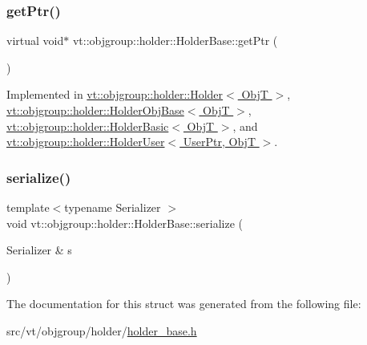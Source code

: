 \subsubsection{\texorpdfstring{get\+Ptr()}{getPtr()}}
{\footnotesize\ttfamily virtual void$\ast$ vt\+::objgroup\+::holder\+::\+Holder\+Base\+::get\+Ptr (\begin{DoxyParamCaption}{ }\end{DoxyParamCaption})\hspace{0.3cm}{\ttfamily [pure virtual]}}



Implemented in \hyperlink{structvt_1_1objgroup_1_1holder_1_1_holder_a856859dca0c0ee3fb6ebace444a36200}{vt\+::objgroup\+::holder\+::\+Holder$<$ Obj\+T $>$}, \hyperlink{structvt_1_1objgroup_1_1holder_1_1_holder_obj_base_aa08fdb3d076043c004e3674a136f84c3}{vt\+::objgroup\+::holder\+::\+Holder\+Obj\+Base$<$ Obj\+T $>$}, \hyperlink{structvt_1_1objgroup_1_1holder_1_1_holder_basic_a2a8962345709045e6d2c465b17362885}{vt\+::objgroup\+::holder\+::\+Holder\+Basic$<$ Obj\+T $>$}, and \hyperlink{structvt_1_1objgroup_1_1holder_1_1_holder_user_a92734867a29d21a7f165cbb4052717db}{vt\+::objgroup\+::holder\+::\+Holder\+User$<$ User\+Ptr, Obj\+T $>$}.

\mbox{\label{structvt_1_1objgroup_1_1holder_1_1_holder_base_a0d01f16a16316fab236b8753e7530efb}} 
\subsubsection{\texorpdfstring{serialize()}{serialize()}}
{\footnotesize\ttfamily template$<$typename Serializer $>$ \\
void vt\+::objgroup\+::holder\+::\+Holder\+Base\+::serialize (\begin{DoxyParamCaption}\item[{Serializer \&}]{s }\end{DoxyParamCaption})\hspace{0.3cm}{\ttfamily [inline]}}



The documentation for this struct was generated from the following file\+:\begin{DoxyCompactItemize}
\item 
src/vt/objgroup/holder/\hyperlink{holder__base_8h}{holder\+\_\+base.\+h}\end{DoxyCompactItemize}
